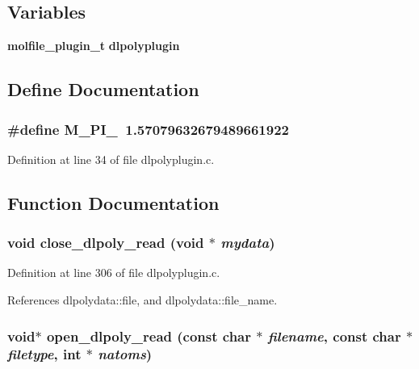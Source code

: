 \subsection*{Variables}
\begin{CompactItemize}
\item 
{\bf molfile\_\-plugin\_\-t} {\bf dlpolyplugin}
\end{CompactItemize}


\subsection{Define Documentation}
\subsubsection{\setlength{\rightskip}{0pt plus 5cm}\#define M\_\-PI\_\ 1.57079632679489661922}\label{dlpolyplugin_8c_a0}




Definition at line 34 of file dlpolyplugin.c.

\subsection{Function Documentation}
\subsubsection{\setlength{\rightskip}{0pt plus 5cm}void close\_\-dlpoly\_\-read (void $\ast$ {\em mydata})\hspace{0.3cm}{\tt  [static]}}\label{dlpolyplugin_8c_a5}




Definition at line 306 of file dlpolyplugin.c.

References dlpolydata::file, and dlpolydata::file\_\-name.
\subsubsection{\setlength{\rightskip}{0pt plus 5cm}void$\ast$ open\_\-dlpoly\_\-read (const char $\ast$ {\em filename}, const char $\ast$ {\em filetype}, int $\ast$ {\em natoms})\hspace{0.3cm}{\tt  [static]}}\label{dlpolyplugin_8c_a2}




